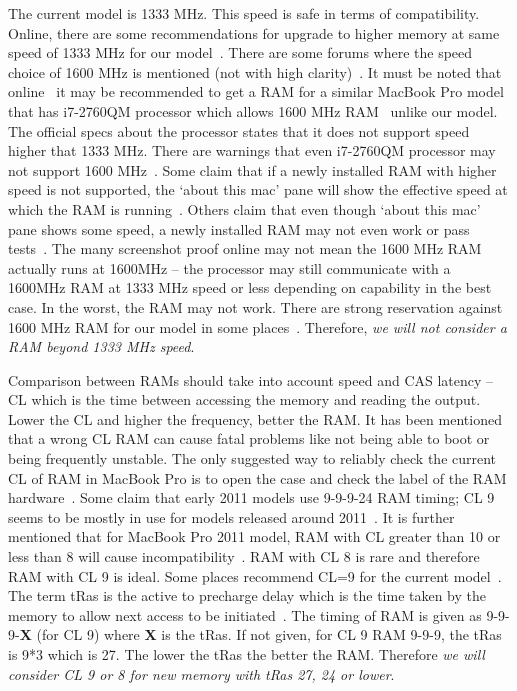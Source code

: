 The current model is 1333 MHz. This speed is safe in terms of compatibility. Online, there are some recommendations for upgrade to higher memory at same speed of 1333 MHz for our model~\cite{everymacramupgrade}. There are some forums where the speed choice of 1600 MHz is mentioned (not with high clarity)~\cite{applestackexramup,macsalesramlist,applestackexramsp,macrumourspforum}. It must be noted that online~\cite{macrumourspforum} it may be recommended to get a RAM for a similar MacBook Pro model that has \intel \core i7-2760QM processor which allows 1600 MHz RAM~\cite{intelprodet2760} unlike our model. The official \intel specs about the processor states that it does not support speed higher that 1333 MHz. There are warnings that even  \intel \core i7-2760QM processor may not support 1600 MHz~\cite{applestackexramsp2}. Some claim that if a newly installed RAM with higher speed is not supported, the `about this mac' pane will show the effective speed at which the RAM is running~\cite{macrumourspforum}. Others claim that even though `about this mac' pane shows some speed, a newly installed RAM may not even work or pass tests~\cite{applestackexramsp2}. The many screenshot proof online may not mean the 1600 MHz RAM actually runs at 1600MHz -- the processor may still communicate with a 1600MHz RAM at 1333 MHz speed or less depending on capability in the best case. In the worst, the RAM may not work. There are strong reservation against 1600 MHz RAM for our model in some places~\cite{applestackexramsp,macrumorbuyram}. Therefore, \emph{we will not consider a RAM beyond 1333 MHz speed}.

Comparison between RAMs should take into account speed and CAS latency -- CL which is the time between accessing the memory and reading the output. Lower the CL and higher the frequency, better the RAM. It has been mentioned~\cite{macrumorbuyram} that a wrong CL RAM can cause fatal problems like not being able to boot or being frequently unstable. The only suggested way to reliably check the current CL of RAM in MacBook Pro is to open the case and check the label of the RAM hardware~\cite{macrumorbuyram}. Some claim that early 2011 models use 9-9-9-24 RAM timing; CL 9 seems to be mostly in use for models released around 2011~\cite{applediss}. It is further mentioned that for MacBook Pro 2011 model, RAM with CL greater than 10 or less than 8 will cause incompatibility~\cite{macrumorbuyram}. RAM with CL 8 is rare and therefore RAM with CL 9 is ideal. 
Some places recommend CL=9 for the current model~\cite{crucialramlist}.
The term tRas is the active to precharge delay which is the time taken by the memory to allow next access to be initiated~\cite{hardwaresec}.
The timing of RAM is given as 9-9-9-\textbf{X} (for CL 9) where \textbf{X} is the tRas. If not given, for CL 9 RAM 9-9-9, the tRas is 9*3 which is 27. The lower the tRas the better the RAM. Therefore \emph{we will consider CL 9 or 8 for new memory with tRas 27, 24 or lower}. 

